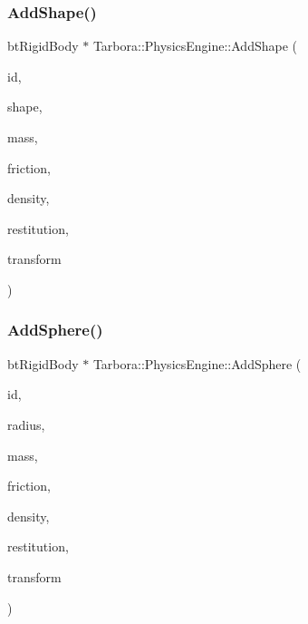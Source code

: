 \subsubsection{\texorpdfstring{Add\+Shape()}{AddShape()}}
{\footnotesize\ttfamily bt\+Rigid\+Body $\ast$ Tarbora\+::\+Physics\+Engine\+::\+Add\+Shape (\begin{DoxyParamCaption}\item[{unsigned int}]{id,  }\item[{bt\+Collision\+Shape $\ast$}]{shape,  }\item[{float}]{mass,  }\item[{float}]{friction,  }\item[{float}]{density,  }\item[{float}]{restitution,  }\item[{glm\+::mat4 \&}]{transform }\end{DoxyParamCaption})}

\mbox{\label{namespaceTarbora_1_1PhysicsEngine_a0a4d9d85104abee858af7f74dfc7213a}} 
\subsubsection{\texorpdfstring{Add\+Sphere()}{AddSphere()}}
{\footnotesize\ttfamily bt\+Rigid\+Body $\ast$ Tarbora\+::\+Physics\+Engine\+::\+Add\+Sphere (\begin{DoxyParamCaption}\item[{unsigned int}]{id,  }\item[{float}]{radius,  }\item[{float}]{mass,  }\item[{float}]{friction,  }\item[{float}]{density,  }\item[{float}]{restitution,  }\item[{glm\+::mat4 \&}]{transform }\end{DoxyParamCaption})}

\mbox{\label{namespaceTarbora_1_1PhysicsEngine_a83b98f62953485af3b5e04d6bf4adba9}} 
